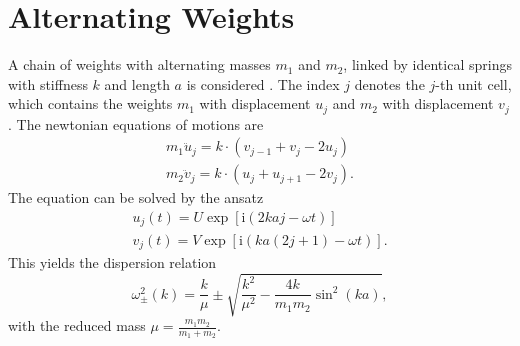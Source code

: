 \section{Alternating Weights}
A chain of weights with alternating masses $m_1$ and $m_2$, linked by identical springs with stiffness $k$ and length $a$ is considered .
The index $j$ denotes the $j$-th unit cell, which contains the weights $m_1$ with displacement $u_j$ and $m_2$ with displacement $v_j$.
The newtonian equations of motions are
\begin{gather*}
	m_1 \ddot u_j = k \cdot \left(v_{j - 1} + v_{j} - 2 u_j \right)\\
	m_2 \ddot v_j = k \cdot \left(u_{j} + u_{j + 1} - 2 v_j \right).
\end{gather*}
The equation can be solved by the ansatz
\begin{gather*}
	u_j(t) = U \exp\left[\text{i} \left(2 k a j - \omega t\right)\right]\\
	v_j(t) = V \exp\left[\text{i} \left(k a (2 j + 1) - \omega t\right)\right].
\end{gather*}
This yields the dispersion relation
\begin{equation}
	\omega_\pm^2(k) = \frac{k}{\mu} \pm \sqrt{\frac{k^2}{\mu^2} - \frac{4k}{m_1 m_2}\sin^2\left(k a\right)},
\end{equation}
with the reduced mass $\mu = \frac{m_1 m_2}{m_1 + m_2}$.
